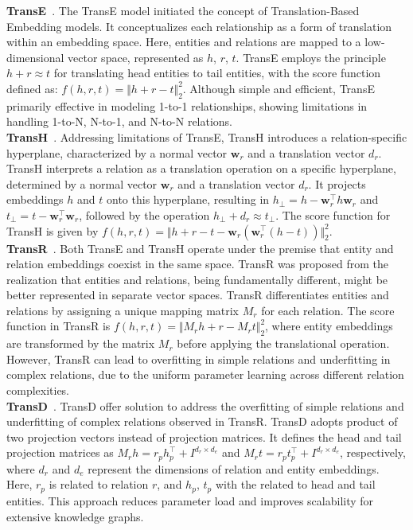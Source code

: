 \documentclass{article}
\begin{document}
\textbf{TransE}~\cite{bordes2013translating}. The TransE model initiated the concept of Translation-Based Embedding models. It conceptualizes each relationship as a form of translation within an embedding space. Here, entities and relations are mapped to a low-dimensional vector space, represented as $h$, $r$, $t$. TransE employs the principle $h + r \approx t$ for translating head entities to tail entities, with the score function defined as: $f(h, r, t) = \Vert h + r - t\Vert_2^2$. Although simple and efficient, TransE primarily effective in modeling 1-to-1 relationships, showing limitations in handling 1-to-N, N-to-1, and N-to-N relations.\\
\textbf{TransH}~\cite{wang2014knowledge}. Addressing limitations of TransE, TransH introduces a relation-specific hyperplane, characterized by a normal vector $\textbf{w}_r$ and a translation vector $d_r$. TransH interprets a relation as a translation operation on a specific hyperplane, determined by a normal vector $\textbf{w}_r$ and a translation vector $d_r$. It projects embeddings $h$ and $t$ onto this hyperplane, resulting in $h_\perp = h - \textbf{w}_r^{\top}h\textbf{w}_r$ and $t_{\perp} = t - \textbf{w}_r^{\top}\textbf{w}_r$, followed by the operation $h_\perp + d_r \approx t_\perp$. The score function for TransH is given by $f(h, r, t) = \Vert h + r - t - \textbf{w}_r(\textbf{w}_r^\top(h - t))\Vert_2^2$.\\
\textbf{TransR}~\cite{lin2015learning}. Both TransE and TransH operate under the premise that entity and relation embeddings coexist in the same space. TransR was proposed from the realization that entities and relations, being fundamentally different, might be better represented in separate vector spaces. TransR differentiates entities and relations by assigning a unique mapping matrix $M_r$ for each relation. The score function in TransR is $f(h, r, t) = \Vert M_r h + r - M_r t\Vert_2^2$, where entity embeddings are transformed by the matrix $M_r$ before applying the translational operation. However, TransR can lead to overfitting in simple relations and underfitting in complex relations, due to the uniform parameter learning across different relation complexities.\\
\textbf{TransD}~\cite{ji2015knowledge}. TransD offer solution to address the overfitting of simple relations and underfitting of complex relations observed in TransR. TransD adopts product of two projection vectors instead of projection matrices. It defines the head and tail projection matrices as $M_rh = r_ph_p^\top + I^{d_r \times d_e}$ and $M_rt = r_pt_p^\top + I^{d_r \times d_e}$, respectively, where $d_r$ and $d_e$ represent the dimensions of relation and entity embeddings. Here, $r_p$ is related to relation $r$, and $h_p$, $t_p$ with the related to head and tail entities. This approach reduces parameter load and improves scalability for extensive knowledge graphs.\\
\end{document}
